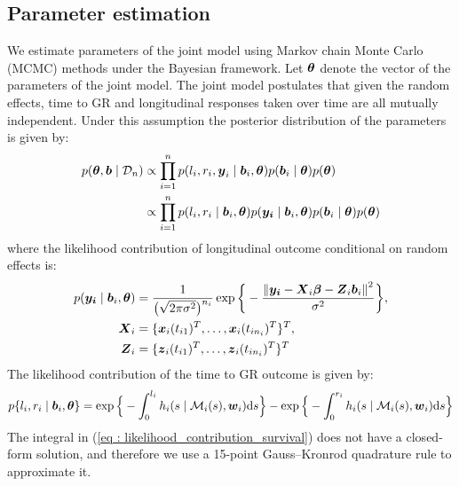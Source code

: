 \subsection{Parameter estimation}
\label{subsec : jm_param_estimation_bayesian}
We estimate parameters of the joint model using Markov chain Monte Carlo (MCMC) methods under the Bayesian framework. Let $\boldsymbol{\theta}$ denote the vector of the parameters of the joint model. The joint model postulates that given the random effects, time to GR and longitudinal responses taken over time are all mutually independent. Under this assumption the posterior distribution of the parameters is given by:
\begin{align*}
p(\boldsymbol{\theta}, \boldsymbol{b} \mid \mathcal{D}_n) & \propto \prod_{i=1}^n p(l_i, r_i, \boldsymbol{y}_i \mid \boldsymbol{b}_i, \boldsymbol{\theta}) p(\boldsymbol{b}_i \mid \boldsymbol{\theta}) p(\boldsymbol{\theta})\\
& \propto \prod_{i=1}^n p(l_i, r_i \mid \boldsymbol{b}_i, \boldsymbol{\theta}) p(\boldsymbol{y_i} \mid \boldsymbol{b}_i, \boldsymbol{\theta}) p(\boldsymbol{b}_i \mid \boldsymbol{\theta}) p(\boldsymbol{\theta})
\end{align*}
where the likelihood contribution of longitudinal outcome conditional on random effects is:
\begin{align*}
p(\boldsymbol{y_i} \mid \boldsymbol{b}_i, \boldsymbol{\theta}) &= \frac{1}{\big(\sqrt{2 \pi \sigma^2}\big)^{n_i}} \exp\bigg\{-\frac{{\lVert{\boldsymbol{y_i} - \boldsymbol{X}_i\boldsymbol{\beta} - \boldsymbol{Z}_i\boldsymbol{b}_i}\rVert}^2}{\sigma^2}\bigg\},\\
\boldsymbol{X}_i &= \{\boldsymbol{x}_i(t_{i1})^T, \ldots, \boldsymbol{x}_i(t_{in_i})^T\}^T,\\
\boldsymbol{Z}_i &= \{\boldsymbol{z}_i(t_{i1})^T, \ldots, \boldsymbol{z}_i(t_{in_i})^T\}^T
\end{align*}
The likelihood contribution of the time to GR outcome is given by:
\begin{equation}
\label{eq : likelihood_contribution_survival}
p\{l_i,r_i\mid \bmath{b}_i,\bmath{\theta}\} = \exp\Big\{-\int_0^{l_i} h_i(s \mid \mathcal{M}_i(s), \bmath{w}_i)\rmn{d}{s}\Big\} - \exp\Big\{-\int_0^{r_i}h_i(s \mid \mathcal{M}_i(s), \bmath{w}_i)\rmn{d}{s}\Big\}
\end{equation}
The integral in (\ref{eq : likelihood_contribution_survival}) does not have a closed-form solution, and therefore we use a 15-point Gauss–Kronrod quadrature rule to approximate it.

